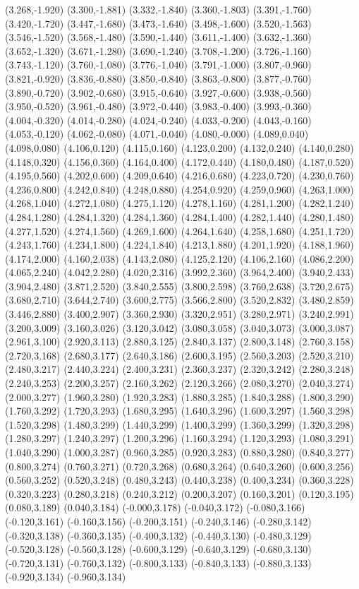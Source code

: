 (3.268,-1.920) (3.300,-1.881) (3.332,-1.840) (3.360,-1.803) (3.391,-1.760) (3.420,-1.720) (3.447,-1.680) (3.473,-1.640) (3.498,-1.600) (3.520,-1.563) (3.546,-1.520) (3.568,-1.480) (3.590,-1.440) (3.611,-1.400) (3.632,-1.360) (3.652,-1.320) (3.671,-1.280) (3.690,-1.240) (3.708,-1.200) (3.726,-1.160) (3.743,-1.120) (3.760,-1.080) (3.776,-1.040) (3.791,-1.000) (3.807,-0.960) (3.821,-0.920) (3.836,-0.880) (3.850,-0.840) (3.863,-0.800) (3.877,-0.760) (3.890,-0.720) (3.902,-0.680) (3.915,-0.640) (3.927,-0.600) (3.938,-0.560) (3.950,-0.520) (3.961,-0.480) (3.972,-0.440) (3.983,-0.400) (3.993,-0.360) (4.004,-0.320) (4.014,-0.280) (4.024,-0.240) (4.033,-0.200) (4.043,-0.160) (4.053,-0.120) (4.062,-0.080) (4.071,-0.040) (4.080,-0.000) (4.089,0.040) (4.098,0.080) (4.106,0.120) (4.115,0.160) (4.123,0.200) (4.132,0.240) (4.140,0.280) (4.148,0.320) (4.156,0.360) (4.164,0.400) (4.172,0.440) (4.180,0.480) (4.187,0.520) (4.195,0.560) (4.202,0.600) (4.209,0.640) (4.216,0.680) (4.223,0.720) (4.230,0.760) (4.236,0.800) (4.242,0.840) (4.248,0.880) (4.254,0.920) (4.259,0.960) (4.263,1.000) (4.268,1.040) (4.272,1.080) (4.275,1.120) (4.278,1.160) (4.281,1.200) (4.282,1.240) (4.284,1.280) (4.284,1.320) (4.284,1.360) (4.284,1.400) (4.282,1.440) (4.280,1.480) (4.277,1.520) (4.274,1.560) (4.269,1.600) (4.264,1.640) (4.258,1.680) (4.251,1.720) (4.243,1.760) (4.234,1.800) (4.224,1.840) (4.213,1.880) (4.201,1.920) (4.188,1.960) (4.174,2.000) (4.160,2.038) (4.143,2.080) (4.125,2.120) (4.106,2.160) (4.086,2.200) (4.065,2.240) (4.042,2.280) (4.020,2.316) (3.992,2.360) (3.964,2.400) (3.940,2.433) (3.904,2.480) (3.871,2.520) (3.840,2.555) (3.800,2.598) (3.760,2.638) (3.720,2.675) (3.680,2.710) (3.644,2.740) (3.600,2.775) (3.566,2.800) (3.520,2.832) (3.480,2.859) (3.446,2.880) (3.400,2.907) (3.360,2.930) (3.320,2.951) (3.280,2.971) (3.240,2.991) (3.200,3.009) (3.160,3.026) (3.120,3.042) (3.080,3.058) (3.040,3.073) (3.000,3.087) (2.961,3.100) (2.920,3.113) (2.880,3.125) (2.840,3.137) (2.800,3.148) (2.760,3.158) (2.720,3.168) (2.680,3.177) (2.640,3.186) (2.600,3.195) (2.560,3.203) (2.520,3.210) (2.480,3.217) (2.440,3.224) (2.400,3.231) (2.360,3.237) (2.320,3.242) (2.280,3.248) (2.240,3.253) (2.200,3.257) (2.160,3.262) (2.120,3.266) (2.080,3.270) (2.040,3.274) (2.000,3.277) (1.960,3.280) (1.920,3.283) (1.880,3.285) (1.840,3.288) (1.800,3.290) (1.760,3.292) (1.720,3.293) (1.680,3.295) (1.640,3.296) (1.600,3.297) (1.560,3.298) (1.520,3.298) (1.480,3.299) (1.440,3.299) (1.400,3.299) (1.360,3.299) (1.320,3.298) (1.280,3.297) (1.240,3.297) (1.200,3.296) (1.160,3.294) (1.120,3.293) (1.080,3.291) (1.040,3.290) (1.000,3.287) (0.960,3.285) (0.920,3.283) (0.880,3.280) (0.840,3.277) (0.800,3.274) (0.760,3.271) (0.720,3.268) (0.680,3.264) (0.640,3.260) (0.600,3.256) (0.560,3.252) (0.520,3.248) (0.480,3.243) (0.440,3.238) (0.400,3.234) (0.360,3.228) (0.320,3.223) (0.280,3.218) (0.240,3.212) (0.200,3.207) (0.160,3.201) (0.120,3.195) (0.080,3.189) (0.040,3.184) (-0.000,3.178) (-0.040,3.172) (-0.080,3.166) (-0.120,3.161) (-0.160,3.156) (-0.200,3.151) (-0.240,3.146) (-0.280,3.142) (-0.320,3.138) (-0.360,3.135) (-0.400,3.132) (-0.440,3.130) (-0.480,3.129) (-0.520,3.128) (-0.560,3.128) (-0.600,3.129) (-0.640,3.129) (-0.680,3.130) (-0.720,3.131) (-0.760,3.132) (-0.800,3.133) (-0.840,3.133) (-0.880,3.133) (-0.920,3.134) (-0.960,3.134) 